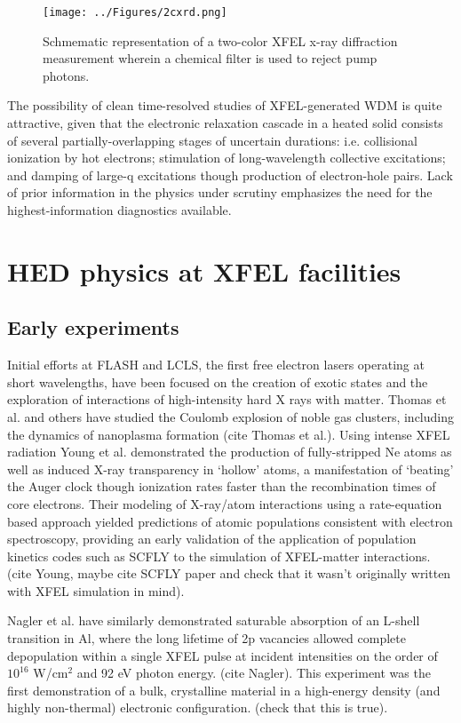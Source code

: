 \documentclass [11pt, proquest, article] {uwthesis}[2016/11/22]
\begin{document}
\begin{figure}[h] 
\caption{Schmematic representation of a two-color XFEL x-ray diffraction measurement wherein a chemical filter is used to reject pump photons.}
\label{2cxrd}
\centering
\texttt{[image: ../Figures/2cxrd.png]}
\end{figure}


The possibility of clean time-resolved studies of XFEL-generated WDM is quite attractive, given that the electronic relaxation cascade in a heated solid consists of several partially-overlapping stages of uncertain durations: i.e. collisional ionization by hot electrons; stimulation of long-wavelength collective excitations; and damping of large-q excitations though production of electron-hole pairs. Lack of prior information in the physics under scrutiny emphasizes the need for the highest-information diagnostics available.

\section{HED physics at XFEL facilities}
\subsection{Early experiments}
Initial efforts at FLASH and LCLS, the first free electron lasers operating at short wavelengths, have been focused on the creation of exotic states and the exploration of interactions of high-intensity hard X rays with matter. Thomas et al. and others have studied the Coulomb explosion of noble gas clusters, including the dynamics of nanoplasma formation (cite Thomas et al.). Using intense XFEL radiation Young et al. demonstrated the production of fully-stripped Ne atoms as well as induced X-ray transparency in `hollow' atoms, a manifestation of `beating' the Auger clock though ionization rates faster than the recombination times of core electrons. Their modeling of X-ray/atom interactions using a rate-equation based approach yielded predictions of atomic populations consistent with electron spectroscopy, providing an early validation of the application of population kinetics codes such as SCFLY to the simulation of XFEL-matter interactions. (cite Young, maybe cite SCFLY paper and check that it wasn't originally written with XFEL simulation in mind).


Nagler et al. have similarly demonstrated saturable absorption of an L-shell transition in Al, where the long lifetime of 2p vacancies allowed complete depopulation within a single XFEL pulse at incident intensities on the order of $10^{16}$ W/cm$^2$ and 92 eV photon energy. (cite Nagler). This experiment was the first demonstration of a bulk, crystalline material in a high-energy density (and highly non-thermal) electronic configuration. (check that this is true). 
\end{document}
